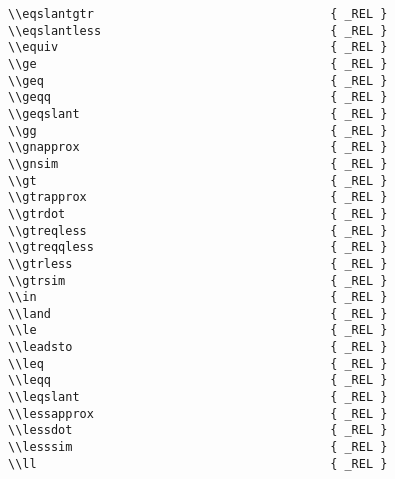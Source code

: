 \begin{verbatim}
\\eqslantgtr                                 { _REL }
\\eqslantless                                { _REL }
\\equiv                                      { _REL }
\\ge                                         { _REL }
\\geq                                        { _REL }
\\geqq                                       { _REL }
\\geqslant                                   { _REL }
\\gg                                         { _REL }
\\gnapprox                                   { _REL }
\\gnsim                                      { _REL }
\\gt                                         { _REL }
\\gtrapprox                                  { _REL }
\\gtrdot                                     { _REL }
\\gtreqless                                  { _REL }  
\\gtreqqless                                 { _REL } 
\\gtrless                                    { _REL } 
\\gtrsim                                     { _REL }
\\in                                         { _REL }
\\land                                       { _REL } 
\\le                                         { _REL }
\\leadsto                                    { _REL }
\\leq                                        { _REL }
\\leqq                                       { _REL }
\\leqslant                                   { _REL }
\\lessapprox                                 { _REL }
\\lessdot                                    { _REL }
\\lesssim                                    { _REL }
\\ll                                         { _REL }

\end{verbatim}
